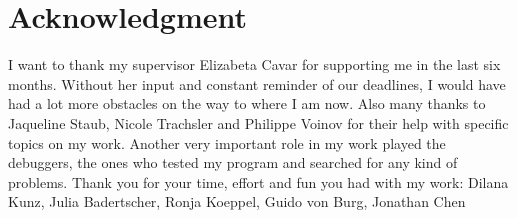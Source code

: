 
\chapter*{Acknowledgment}

I want to thank my supervisor Elizabeta Cavar for supporting me in the last six months.
Without her input and constant reminder of our deadlines, I would have had a lot more obstacles on the way to where I am now.
Also many thanks to Jaqueline Staub, Nicole Trachsler and Philippe Voinov for their help with specific topics on my work.
Another very important role in my work played the debuggers, the ones who tested my program and searched for any kind of problems.
Thank you for your time, effort and fun you had with my work:
Dilana Kunz, Julia Badertscher, Ronja Koeppel, Guido von Burg, Jonathan Chen
